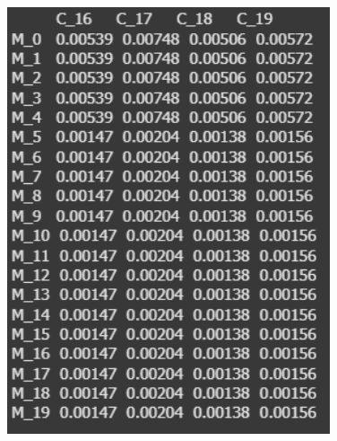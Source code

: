\begin{figure}[!ht]
\begin{minipage}{0.25\linewidth}
        \includegraphics[width=0.85\textwidth]{ReportPic/report_2.3.png}
    \end{minipage}
\end{figure}

